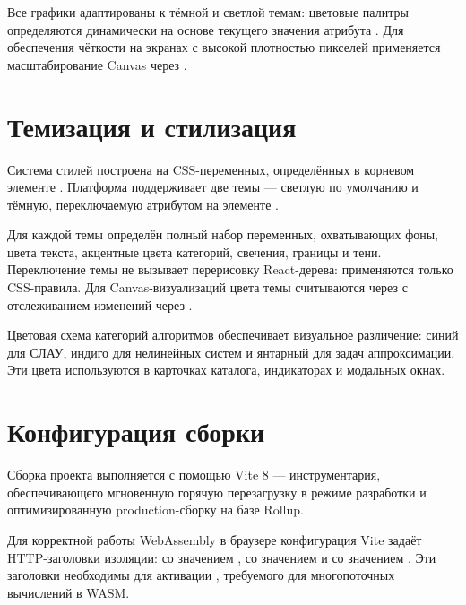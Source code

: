 \documentclass[12pt, oneside]{book}
\begin{document}
    \quad Все графики адаптированы к тёмной и светлой темам: цветовые палитры определяются динамически на основе текущего значения атрибута \texttt{}. Для обеспечения чёткости на экранах с высокой плотностью пикселей применяется масштабирование Canvas через \texttt{}.

\section{Темизация и стилизация}

    \quad Система стилей построена на CSS-переменных, определённых в корневом элементе \texttt{}. Платформа поддерживает две темы --- светлую по умолчанию и тёмную, переключаемую атрибутом \texttt{} на элементе \texttt{}.

    \quad Для каждой темы определён полный набор переменных, охватывающих фоны, цвета текста, акцентные цвета категорий, свечения, границы и тени. Переключение темы не вызывает перерисовку React-дерева: применяются только CSS-правила. Для Canvas-визуализаций цвета темы считываются через \texttt{} с отслеживанием изменений через \texttt{}.

    \quad Цветовая схема категорий алгоритмов обеспечивает визуальное различение: синий для СЛАУ, индиго для нелинейных систем и янтарный для задач аппроксимации. Эти цвета используются в карточках каталога, индикаторах и модальных окнах.

\section{Конфигурация сборки}

    \quad Сборка проекта выполняется с помощью Vite 8 --- инструментария, обеспечивающего мгновенную горячую перезагрузку в режиме разработки и оптимизированную production-сборку на базе Rollup.

    \quad Для корректной работы WebAssembly в браузере конфигурация Vite задаёт HTTP-заголовки изоляции: \texttt{} со значением \texttt{}, \texttt{} со значением \texttt{} и \texttt{} со значением \texttt{}. Эти заголовки необходимы для активации \texttt{}, требуемого для многопоточных вычислений в WASM.
\end{document}
